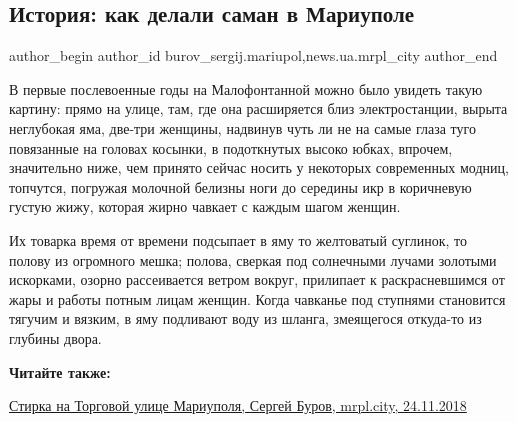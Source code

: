  
 
 
 
 
 
\subsection{История: как делали саман в Мариуполе}
\label{sec:04_05_2019.stz.news.ua.mrpl_city.1.istoria_kak_delali_saman_v_mariupole}
 
\ifcmt
 author_begin
   author_id burov_sergij.mariupol,news.ua.mrpl_city
 author_end
\fi


В первые послевоенные годы на Малофонтанной можно было увидеть такую картину:
прямо на улице, там, где она расширяется близ электростанции, вырыта неглубокая
яма, две-три женщины, надвинув чуть ли не на самые глаза туго повязанные на
головах косынки, в подоткнутых высоко юбках, впрочем, значительно ниже, чем
принято сейчас носить у некоторых современных модниц, топчутся, погружая
молочной белизны ноги до середины икр в коричневую густую жижу, которая жирно
чавкает с каждым шагом женщин.

Их товарка время от времени подсыпает в яму то желтоватый суглинок, то полову
из огромного мешка; полова, сверкая под солнечными лучами золотыми искорками,
озорно рассеивается ветром вокруг, прилипает к раскрасневшимся от жары и работы
потным лицам женщин. Когда чавканье под ступнями становится тягучим и вязким, в
яму подливают воду из шланга, змеящегося откуда-то из глубины двора.

\vspace{0.5cm}
\begin{minipage}{0.9\textwidth}
\textbf{Читайте также:}

\href{https://archive.org/details/24_11_2018.sergij_burov.mrpl_city.stirka_na_torgovoj_ulice_mariupolja}{%
Стирка на Торговой улице Мариуполя, Сергей Буров, mrpl.city, 24.11.2018}
\end{minipage}
\vspace{0.5cm}

